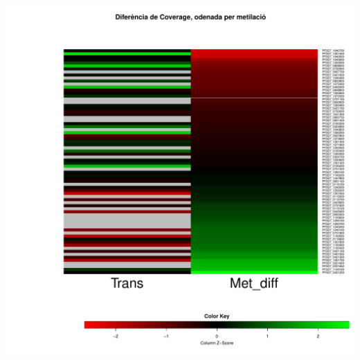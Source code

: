 \documentclass{article}\usepackage[]{graphicx}\usepackage[]{color}
\newenvironment{knitrout}{}{} %
\begin{document}
\begin{knitrout}
\color{fgcolor}

{\centering \includegraphics[width=.9\linewidth]{figure/minimal-heat_cov_diff_filter_metord-1} 

}



\end{knitrout}
\clearpage
\end{document}
